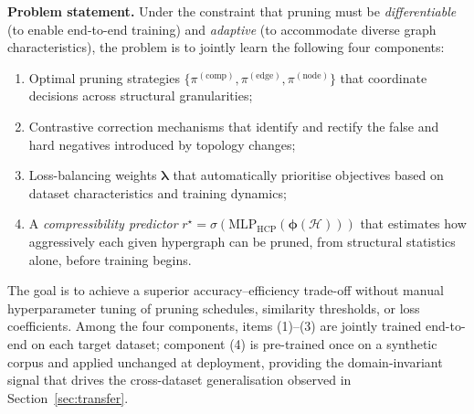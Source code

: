 \documentclass[10pt]{article}
\theoremstyle{plain}
\theoremstyle{definition}
\begin{document}
\textbf{Problem statement.} Under the constraint that pruning must be \emph{differentiable} (to enable end-to-end training) and \emph{adaptive} (to accommodate diverse graph characteristics), the problem is to jointly learn the following four components: 
\begin{enumerate}[leftmargin=*,itemsep=2pt]
\item Optimal pruning strategies $\{\pi^{(\mathrm{comp})},\pi^{(\mathrm{edge})}, \pi^{(\mathrm{node})}\}$ that coordinate decisions across structural granularities;
\item Contrastive correction mechanisms that identify and rectify the false and hard negatives introduced by       topology changes;
\item Loss-balancing weights $\boldsymbol{\lambda}$ that automatically prioritise objectives based on dataset       characteristics and training dynamics;
\item A \emph{compressibility predictor}
      $r^{\star}=\sigma(\mathrm{MLP}_{\mathrm{HCP}} (\boldsymbol{\phi}(\mathcal{H})))$ that estimates how       aggressively each given hypergraph can be pruned, from structural statistics alone, before training begins.
\end{enumerate}
The goal is to achieve a superior accuracy--efficiency trade-off without manual hyperparameter tuning of pruning schedules, similarity thresholds, or loss coefficients. Among the four components, items (1)--(3) are jointly trained end-to-end on each target dataset; component (4) is pre-trained once on a synthetic corpus and applied unchanged at deployment, providing the domain-invariant signal that drives the cross-dataset generalisation observed in Section~\ref{sec:transfer}.
\end{document}
